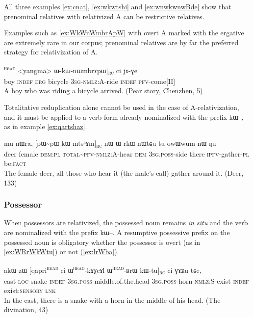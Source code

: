 \documentclass[oldfontcommands,oneside,a4paper,11pt]{article}
\newcommand{\ipa}[1]{{\phon #1}} %
\newcommand{\tete}{\textsuperscript{\textsc{head}}}
\newcommand{\rc}{\textsubscript{\textsc{rc}}}
\begin{document}
All three examples \ref{ex:cnat},  \ref{ex:wkwtshi} and \ref{ex:wnwkwnwBde} show that prenominal relatives with relativized A can be restrictive relatives.

Examples such as \ref{ex:WkWnWmbrApW} with overt A marked with the ergative are extremely rare in our corpus; prenominal relatives are by far the preferred strategy for relativization of A.
\begin{exe}
   \ex  \label{ex:WkWnWmbrApW}
\gll [[\ipa{tɤpɤtso}  	\ipa{ci}  	\ipa{kɯ}]\tete{}  	<yangma> 	\ipa{ɯ-kɯ-nɯmbrɤpɯ}]\rc{}  	\ipa{ci}  	\ipa{jɤ-ɣe}  \\
boy \textsc{indef} \textsc{erg} bicycle \textsc{3sg-nmlz:A}-ride \textsc{indef} \textsc{pfv}-come[II] \\
\glt A boy who was riding a bicycle arrived. (Pear story, Chenzhen, 5)
\end{exe}


Totalitative reduplication alone cannot be used in the case of A-relativization, and it must be applied to a verb form already nominalized with the prefix \ipa{kɯ}--, as in example \ref{ex:qartshaz}.

\begin{exe}
   \ex \label{ex:qartshaz}
   \gll \ipa{qartsʰaz}  	\ipa{mu}  	\ipa{nɯra,}  	[\ipa{pɯ\textasciitilde{}pɯ-kɯ-mtsʰɤm}]\rc{}  	\ipa{nɯ}  	\ipa{ɯ-rkɯ}  	\ipa{nɯtɕu}  	\ipa{tu-owɯwum-nɯ}  	\ipa{ŋu}  \\
   deer female \textsc{dem:pl} \textsc{total\textasciitilde{}pfv-nmlz:A}-hear \textsc{dem} \textsc{3sg.poss}-side there \textsc{ipfv}-gather-\textsc{pl} be:\textsc{fact} \\
\glt The female deer, all those who hear it (the male's call) gather around it. (Deer, 133)
\end{exe}

\subsubsection{Possessor}
When possessors are relativized, the possessed noun remains \textit{in situ} and the verb are nominalized with the prefix \ipa{kɯ}--. A resumptive possessive prefix on the possessed noun is obligatory whether the possessor is overt (as in \ref{ex:WRrWkWtu}) or not (\ref{ex:lrWba}).


      \begin{exe}
   \ex \label{ex:WRrWkWtu}
 \gll 
\ipa{akɯ}   	\ipa{zɯ}   	[\ipa{qapri}\tete{}   	\ipa{ci}   	\ipa{ɯ}\tete{}-\ipa{kɤχcɤl}  	\ipa{ɯ}\tete{}-\ipa{ʁrɯ}   	\ipa{kɯ-tu}]\rc{}   	\ipa{ci}   	\ipa{ɣɤʑu}   	\ipa{tɕe,}   \\
east \textsc{loc} snake \textsc{indef} \textsc{3sg.poss}-middle.of.the.head  \textsc{3sg.poss}-horn \textsc{nmlz:S}-exist \textsc{indef} exist:\textsc{sensory}  \textsc{lnk} \\
\glt In the east, there is a snake with a horn in the middle of his head.  (The divination, 43)
\end{exe}
 
\end{document}
